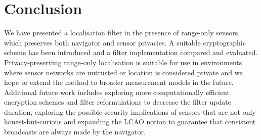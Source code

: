 \documentclass[10pt,letterpaper,oneside,twocolumn,journal]{IEEEtran}
\theoremstyle{definition}
\theoremstyle{definition}
\theoremstyle{remark}
\begin{document}
\section{Conclusion} \label{sec:conclusion}
We have presented a localisation filter in the presence of range-only sensors, which preserves both navigator and sensor privacies. A suitable cryptographic scheme has been introduced and a filter implementation compared and evaluated. Privacy-preserving range-only localisation is suitable for use in environments where sensor networks are untrusted or location is considered private and we hope to extend the method to broader measurement models in the future. Additional future work includes exploring more computationally efficient encryption schemes and filter reformulations to decrease the filter update duration, exploring the possible security implications of sensors that are not only honest-but-curious and expanding the LCAO notion to guarantee that consistent broadcasts are always made by the navigator.

% 
%                                                                                         
%                                                                                         
%                                                                                         
% 

\appendices
\end{document}
